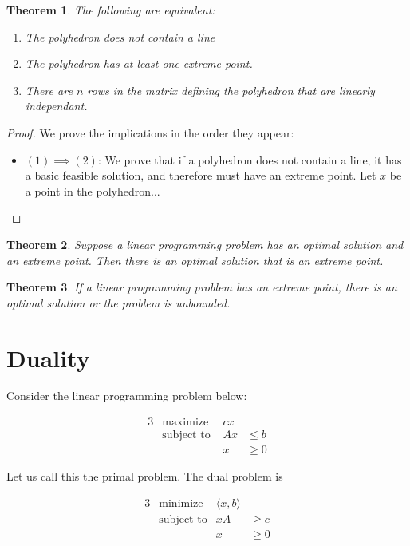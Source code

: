 \documentclass{report}
\newtheorem{theorem}{Theorem}[chapter]
\begin{document}
    \begin{theorem}
        The following are equivalent:

        \begin{enumerate}
            \item The polyhedron does not contain a line
            \item The polyhedron has at least one extreme point.
            \item There are $n$ rows in the matrix defining the polyhedron that are linearly independant.
        \end{enumerate}
    \end{theorem}

    \begin{proof}
        We prove the implications in the order they appear:

        \begin{itemize}
            \item $(1) \implies (2)$: We prove that if a polyhedron does not contain a line, it has a basic feasible solution, and therefore must have an extreme point. Let $x$ be a point in the polyhedron...
        \end{itemize}
    \end{proof}

    \begin{theorem}
        Suppose a linear programming problem has an optimal solution and an extreme point. Then there is an optimal solution that is an extreme point.
    \end{theorem}

    \begin{theorem}
        If a linear programming problem has an extreme point, there is an optimal solution or the problem is unbounded.
    \end{theorem}

    \chapter{Duality}

    Consider the linear programming problem below:

    \begin{alignat*}{3}
        &\text{maximize } & cx\\
        &\text{subject to } & Ax &\leq b\\
        &                  & x &\geq 0
    \end{alignat*}

    Let us call this the primal problem. The dual problem is

    \begin{alignat*}{3}
        &\text{minimize }   & \langle x, b \rangle &\\
        &\text{subject to}  & xA &\geq c\\
        &                   & x  &\geq 0
    \end{alignat*}
\end{document}
